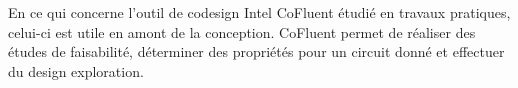 En ce qui concerne l'outil de codesign Intel CoFluent étudié en travaux pratiques, celui-ci est utile en amont de la conception.
CoFluent permet de réaliser des études de faisabilité, déterminer des propriétés pour un circuit donné et effectuer du design exploration.




